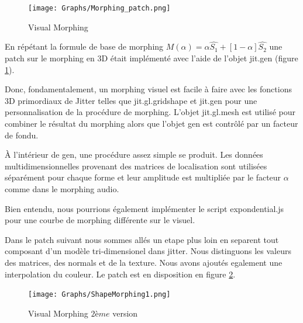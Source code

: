     \begin{figure}
        \centering
        \texttt{[image: Graphs/Morphing\_patch.png]}
        \caption{Visual Morphing}
        \label{VisualMorph}
    \end{figure}


En répétant la formule de base de morphing $M(\alpha) = \alpha\widehat {S_1} + [1 -\alpha]\widehat {S_2} $ une patch sur le morphing en 3D était implémenté avec l'aide de l'objet jit.gen (figure \ref{VisualMorph}).

Donc, fondamentalement, un morphing visuel est facile à faire avec les fonctions 3D primordiaux de Jitter telles que jit.gl.gridshape et jit.gen pour une personnalisation de la procédure de morphing. L'objet jit.gl.mesh est utilisé pour combiner le résultat du morphing alors que l'objet gen est contrôlé par un facteur de fondu.

À l'intérieur de gen, une procédure assez simple se produit. Les données multidimensionnelles provenant des matrices de localisation sont utilisées séparément pour chaque forme et leur amplitude est multipliée par le facteur $\alpha$ comme dans le morphing audio.

Bien entendu, nous pourrions également implémenter le script expondential.js pour une courbe de morphing différente sur le visuel.

Dans le patch suivant nous sommes allés un etape plus loin en separent tout composant d'un modèle tri-dimensionel dans jitter. Nous distinguons les valeurs des matrices, des normals et de la texture. Nous avons ajoutés egalement une interpolation du couleur. Le patch est en disposition en figure \ref{VisualMorph2}.

    \begin{figure}
        \centering
        \texttt{[image: Graphs/ShapeMorphing1.png]}
        \caption{Visual Morphing $2{ème}$ version}
        \label{VisualMorph2}
    \end{figure} 

